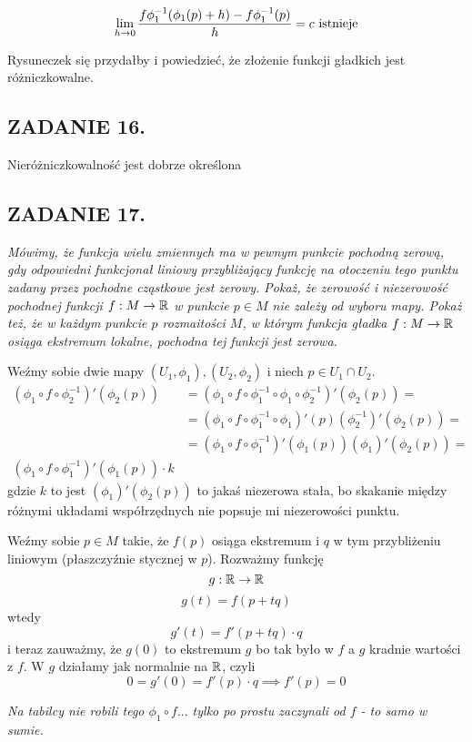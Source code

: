 \documentclass{article}
\begin{document}
$$\lim\limits_{h\to0}{f\phi_1^{-1}(\phi_1(p)+h)-f\phi_1^{-1}(p)\over h}=c\text{ istnieje}$$

Rysuneczek się przydałby i powiedzieć, że złożenie funkcji gładkich jest różniczkowalne.

\subsection*{ZADANIE 16.}
Nieróżniczkowalność jest dobrze określona

\subsection*{ZADANIE 17.}
\emph{\color{pink}Mówimy, że funkcja wielu zmiennych ma w pewnym punkcie pochodną zerową, gdy odpowiedni funkcjonał liniowy przybliżający funkcję na otoczeniu tego punktu zadany przez pochodne cząstkowe jest zerowy. Pokaż, że zerowość i niezerowość pochodnej funkcji $f:M\to\mathbb{R}$ w punkcie $p\in M$ nie zależy od wyboru mapy. Pokaż też, że w każdym punkcie $p$ rozmaitości $M$, w którym funkcja gładka $f:M\to\mathbb{R}$ osiąga ekstremum lokalne, pochodna tej funkcji jest zerowa.}
\smallskip

Weźmy sobie dwie mapy $(U_1,\phi_1),(U_2,\phi_2)$ i niech $p\in U_1\cap U_2$.
\begin{align*}
    (\phi_1\circ f\circ\phi_2^{-1})'(\phi_2(p))&=(\phi_1\circ f\circ\phi_1^{-1}\circ \phi_1\circ\phi_2^{-1})'(\phi_2(p))=\\
    &=(\phi_1\circ f\circ\phi_1^{-1}\circ\phi_1)'(p)(\phi_2^{-1})'(\phi_2(p))=\\
    &=(\phi_1\circ f\circ\phi_1^{-1})'(\phi_1(p))(\phi_1)'(\phi_2(p))=\\
    (\phi_1\circ f\circ\phi_1^{-1})'(\phi_1(p))\cdot k
\end{align*}
gdzie $k$ to jest $(\phi_1)'(\phi_2(p))$ to jakaś niezerowa stała, bo skakanie między różnymi układami współrzędnych nie popsuje mi niezerowości punktu.

Weźmy sobie $p\in M$ takie, że $f(p)$ osiąga ekstremum i $q$ w tym przybliżeniu liniowym (płaszczyźnie stycznej w $p$). Rozważmy funkcję
$$g:\mathbb{R}\to\mathbb{R}$$
$$g(t)=f(p+tq)$$
wtedy
$$g'(t)=f'(p+tq)\cdot q$$
i teraz zauważmy, że $g(0)$ to ekstremum $g$ bo tak było w $f$ a $g$ kradnie wartości z $f$. W $g$ działamy jak normalnie na $\mathbb{R}$, czyli
$$0=g'(0)=f'(p)\cdot q\implies f'(p)=0$$

\emph{Na tabilcy nie robili tego $\phi_1\circ f...$ tylko po prostu zaczynali od $f$ - to samo w sumie.}
\end{document}
